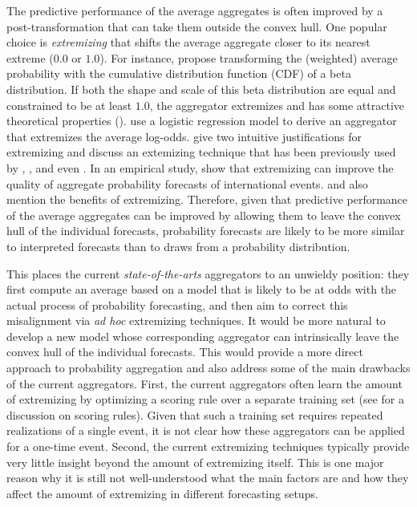 \documentclass[11pt]{article}
\theoremstyle{definition}
\theoremstyle{definition}
\begin{document}
The predictive performance of the average aggregates is often improved by a post-transformation that can take them outside the convex hull. One popular choice is \textit{extremizing} that shifts the average aggregate closer to its nearest extreme ($0.0$ or $1.0$). 
For instance, \cite{Ranjan08} propose transforming the (weighted) average probability with the cumulative distribution function (CDF) of a beta distribution. If both the shape and scale of this beta distribution are equal and constrained to be at least $1.0$,  the aggregator extremizes and has some attractive theoretical properties (\cite{Wallsten2001}). \cite{satopaa} use a logistic regression model to derive an aggregator that extremizes the average log-odds. \cite{baron2014two} give two intuitive justifications for extremizing and discuss an extemizing technique that has been previously used by \cite{Erev1994}, \cite{shlomi2010subjective}, and even \cite{karmarkar1978subjectively}. In an empirical study, \cite{mellers2014psychological} show that extremizing can improve the quality of aggregate probability forecasts of international events.   \cite{turner2013forecast} and \cite{Ariely00theeffects} also mention the benefits of extremizing. Therefore, given that predictive performance of the average aggregates can be improved by allowing them to leave the convex hull of the individual forecasts, probability forecasts are likely to be more similar to interpreted forecasts than to draws from a probability distribution. 



This places the current \textit{state-of-the-arts} aggregators to an unwieldy position: they first compute an average based on a model that is likely to be at odds with the actual process of probability forecasting, and then aim to correct this misalignment via \textit{ad hoc} extremizing techniques. It would be more natural to develop a new model whose corresponding aggregator can intrinsically leave the convex hull of the individual forecasts. This would provide a more direct approach to probability aggregation and also address some of the main drawbacks of the current aggregators. First, the current aggregators often learn the amount of extremizing  by optimizing a scoring rule over a separate training set (see \cite{Gneiting04strictlyproper} for a discussion on scoring rules). Given that such a training set requires repeated realizations of a single event, it is not clear how these aggregators can be applied for a one-time event. Second, the current extremizing techniques typically provide very little insight beyond the amount of extremizing itself. This is one major reason why it is still not well-understood what the main factors are and how they affect the amount of extremizing in different forecasting setups. 
\end{document}
